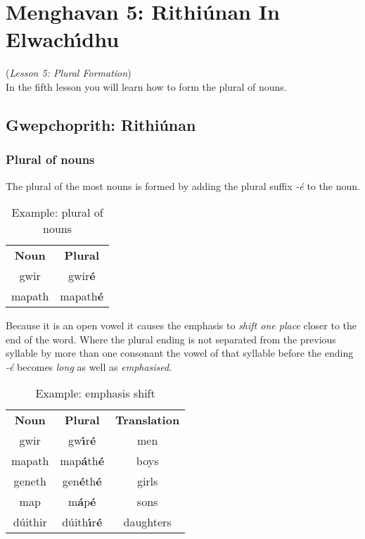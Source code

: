 \section{Menghavan 5: Rithi\'{u}nan In Elwach\'{\i}dhu}
(\textit{Lesson 5: Plural Formation})\\

In the fifth lesson you will learn how to form the plural of nouns.\\

\subsection{Gwepchoprith: Rithi\'{u}nan}
\subsubsection{Plural of nouns}

The plural of the most nouns is formed by adding the plural suffix \textit{-\'{e}} to the noun.
\begin{table}[H]
\centering
\begin{tabular}{cc}
  \toprule
  \textbf{Noun} & \textbf{Plural}\\
  \cmidrule(lr){1-1}\cmidrule(lr){2-2}
  gwir & gwir\textbf{\'{e}}\\
  mapath & mapath\textbf{\'{e}}\\
  \bottomrule
\end{tabular}
\caption{Example: plural of nouns}
\label{example_noun_plural}
\end{table}

Because it is an open vowel it causes the emphasis to \textit{shift one place} closer to the end of the word. Where the plural ending is not separated from the previous syllable by more than one consonant the vowel of that syllable before the ending \textit{-\'{e}} becomes \textit{long} as well as \textit{emphasised}.
\begin{table}[H]
\centering
\begin{tabular}{ccc}
  \toprule
  \textbf{Noun} & \textbf{Plural} & \textbf{Translation}\\
  \cmidrule(lr){1-1}\cmidrule(lr){2-2}\cmidrule(lr){3-3}
  gwir & gw\textbf{\'{\i}}r\textbf{\'{e}} & men\\
  mapath & map\textbf{\'{a}}th\textbf{\'{e}} & boys\\
  geneth & gen\textbf{\'{e}}th\textbf{\'{e}} & girls\\
  map & m\textbf{\'{a}}p\textbf{\'{e}} & sons\\
  d\'{u}ithir & d\'{u}ith\textbf{\'{\i}}r\textbf{\'{e}} & daughters\\
  \bottomrule
\end{tabular}
\caption{Example: emphasis shift}
\label{example_emphasis_shift}
\end{table}

